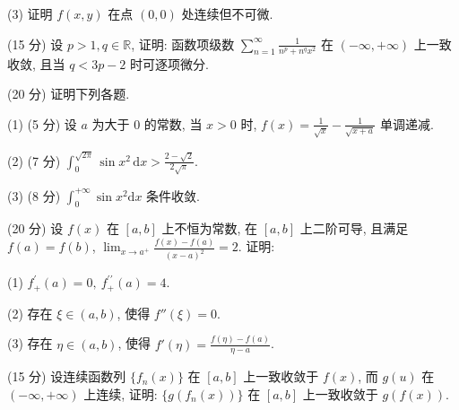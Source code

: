 (3) 证明 $f(x, y)$ 在点 $(0, 0)$ 处连续但不可微.\par
(15 分) 设 $p > 1, q \in \mathbb{R}$, 证明: 函数项级数 $\sum_{n=1}^{\infty} \frac{1}{n^p + n^q x^2}$ 在 $(- \infty, +\infty)$ 上一致收敛, 且当 $q < 3p - 2$ 时可逐项微分.\par
(20 分) 证明下列各题.\par
(1) (5 分) 设 $a$ 为大于 0 的常数, 当 $x > 0$ 时, $f(x) = \frac{1}{\sqrt{x}} - \frac{1}{\sqrt{x + a}}$ 单调递减.\par
(2) (7 分) $\int_{0}^{\sqrt{2\pi}} \sin x^{2} \, \mathrm{d}x > \frac{2 - \sqrt{2}}{2\sqrt{\pi}}$.\par
(3) (8 分) $\int_{0}^{+\infty}\sin x^{2}\mathrm{d}x$ 条件收敛.\par
(20 分) 设 $f(x)$ 在 $[a, b]$ 上不恒为常数, 在 $[a, b]$ 上二阶可导, 且满足 $f(a) = f(b)$, $\lim_{x \to a^{+}} \frac{f(x) - f(a)}{(x - a)^2} = 2$. 证明:\par
(1) $f_{+}^{\prime}(a)=0,\ f_{+}^{\prime\prime}(a)=4.$\par
(2) 存在 $\xi \in (a, b)$, 使得 $f''(\xi) = 0$.\par
(3) 存在 $\eta \in (a, b)$, 使得 $f'(\eta) = \frac{f(\eta) - f(a)}{\eta - a}$.\par
(15 分) 设连续函数列 $\{f_n(x)\}$ 在 $[a, b]$ 上一致收敛于 $f(x)$, 而 $g(u)$ 在 $(- \infty, +\infty)$ 上连续, 证明: $\{g(f_n(x))\}$ 在 $[a, b]$ 上一致收敛于 $g(f(x))$.\par
